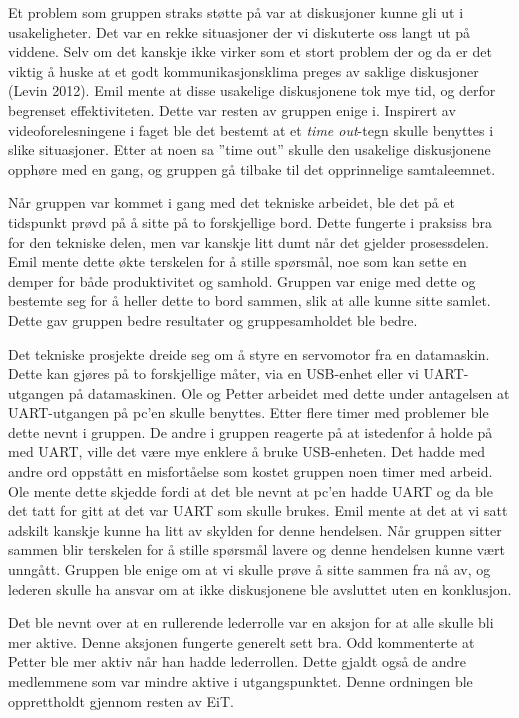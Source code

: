 Et problem som gruppen straks støtte på var at diskusjoner kunne gli ut i usakeligheter. 
Det var en rekke situasjoner der vi diskuterte oss langt ut på viddene. 
Selv om det kanskje ikke virker som et stort problem der og da er det viktig å huske at et godt kommunikasjonsklima preges av saklige diskusjoner (Levin 2012). 
Emil mente at disse usakelige diskusjonene tok mye tid, og derfor begrenset effektiviteten. 
Dette var resten av gruppen enige i. 
Inspirert av videoforelesningene i faget ble det bestemt at et \textit{time out}-tegn skulle benyttes i slike situasjoner. 
Etter at noen sa ''time out'' skulle den usakelige diskusjonene opphøre med en gang, og gruppen gå tilbake til det opprinnelige samtaleemnet. 
\vspace{\secspace}

Når gruppen var kommet i gang med det tekniske arbeidet, ble det på et tidspunkt prøvd på å sitte på to forskjellige bord. 
Dette fungerte i praksiss bra for den tekniske delen, men var kanskje litt dumt når det gjelder prosessdelen. 
Emil mente dette økte terskelen for å stille spørsmål, noe som kan sette en demper for både produktivitet og samhold. 
Gruppen var enige med dette og bestemte seg for å heller dette to bord sammen, slik at alle kunne sitte samlet. 
Dette gav gruppen bedre resultater og gruppesamholdet ble bedre.
\vspace{\secspace}

Det tekniske prosjekte dreide seg om å styre en servomotor fra en datamaskin. 
Dette kan gjøres på to forskjellige måter, via en USB-enhet eller vi UART-utgangen på datamaskinen. 
Ole og Petter arbeidet med dette under antagelsen at UART-utgangen på pc'en skulle benyttes. 
Etter flere timer med problemer ble dette nevnt i gruppen. 
De andre i gruppen reagerte på at istedenfor å holde på med UART, ville det være mye enklere å bruke USB-enheten. 
Det hadde med andre ord oppstått en misfortåelse som kostet gruppen noen timer med arbeid. 
Ole mente dette skjedde fordi at det ble nevnt at pc'en hadde UART og da ble det tatt for gitt at det var UART som skulle brukes. 
Emil mente at det at vi satt adskilt kanskje kunne ha litt av skylden for denne hendelsen. 
Når gruppen sitter sammen blir terskelen for å stille spørsmål lavere og denne hendelsen kunne vært unngått. 
Gruppen ble enige om at vi skulle prøve å sitte sammen fra nå av, og lederen skulle ha ansvar om at ikke diskusjonene ble avsluttet uten en konklusjon. 
\vspace{\secspace}

Det ble nevnt over at en rullerende lederrolle var en aksjon for at alle skulle bli mer aktive. 
Denne aksjonen fungerte generelt sett bra. 
Odd kommenterte at Petter ble mer aktiv når han hadde lederrollen. 
Dette gjaldt også de andre medlemmene som var mindre aktive i utgangspunktet. 
Denne ordningen ble opprettholdt gjennom resten av EiT. 
\vspace{\secspace}

